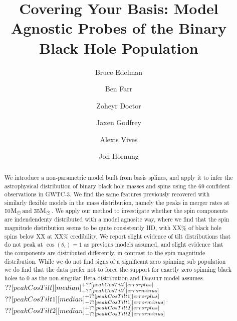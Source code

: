\documentclass[twocolumn, linenumber]{aastex63}
\newcommand{\msun}{\ensuremath{{\rm M}_\odot}}
\newcommand{\result}[1]{\textcolor{red}{#1}}
\newcommand{\CIPlusMinus}[1]{{#1[median]^{+#1[error plus]}_{-#1[error minus]}}}
\begin{document}
\title{Covering Your Basis: Model Agnostic Probes of the Binary Black Hole Population}

\author{Bruce Edelman}

\author{Ben Farr}

\author{Zoheyr Doctor}

\author{Jaxen Godfrey}

\author{Alexis Vives}

\author{Jon Hornung}

\begin{abstract}
We introduce a non-parametric model built from basis splines, and apply it to infer the astrophysical distribution of 
binary black hole masses and spins using the 69 confident observations in GWTC-3. We find the same features previously recovered 
with similarly flexible models in the mass distribution, namely the peaks in merger rates at \~10\msun and \~35\msun. 
We apply our method to investigate whether the spin components are indendendenty distributed with a model agnositc way, where we find that 
the spin magnitude distribution seems to be quite consistently IID, with XX\% of black hole spins below XX at XX\% credibility. We report 
slight evidence of tilt distributions that do not peak at $\cos(\theta_i) = 1$ as previous models assumed, and slight evidence that 
the components are distributed differently, in contrast to the spin magnitude distribution. While we do not find signs of a significant
zero spinning sub population we do find that the data prefer not to force the support for exactly zero spinning black holes to 0 as 
the non-singular Beta distribution and \textsc{Default} model assumes. \result{$\CIPlusMinus{\macros[MSPlineIIDCompSpins][peakCosTilt]}$}
\result{$\CIPlusMinus{\macros[MSPlineIndependentCompSpins][peakCosTilt1]}$}, \result{$\CIPlusMinus{\macros[MSPlineIndependentCompSpins][peakCosTilt2]}$}
\end{abstract}
\end{document}
